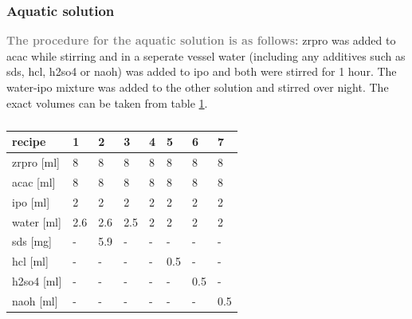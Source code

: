 \documentclass[a4paper]{article}
\newcommand{\me}[1]{\textbf{\textcolor{gray}{#1}}}
\begin{document}
\subsubsection{Aquatic solution}
\me{The procedure for the aquatic solution is as follows:}
\gls{zrpro} was added to \gls{acac} while stirring and in a seperate vessel \gls{water} (including any additives such as \gls{sds}, \gls{hcl}, \gls{h2so4} or \gls{naoh}) was added to \gls{ipo} and both were stirred for 1 hour. 
The \gls{water}-\gls{ipo} mixture was added to the other solution and stirred over night. 
The exact volumes can be taken from table \ref{tab:rec1}.
\begin{table}[h]
	\centering
	\caption{}
	\label{tab:rec1}
	\begin{tabular}{llllllll}
		\hline
		recipe				&1		&2		&3		&4		&5		&6		&7\\
		\hline
		\gls{zrpro} [ml]	&8		&8		&8		&8		&8		&8		&8\\
		\gls{acac} [ml]		&8		&8		&8		&8		&8		&8		&8\\
		\gls{ipo} [ml]		&2		&2		&2		&2		&2		&2		&2\\
		\gls{water} [ml]		&2.6	&2.6	&2.5	&2		&2		&2		&2\\
		\gls{sds} [mg]		&-		&5.9	&-		&-		&-		&-		&-\\
		\gls{hcl} [ml]		&-		&-		&-		&-		&0.5	&-		&-\\
		\gls{h2so4} [ml]	&-		&-		&-		&-		&-		&0.5	&-\\
		\gls{naoh} [ml] 	&-		&-		&-		&-		&-		&-		&0.5\\
		\hline
	\end{tabular}
\end{table}
%
\end{document}
